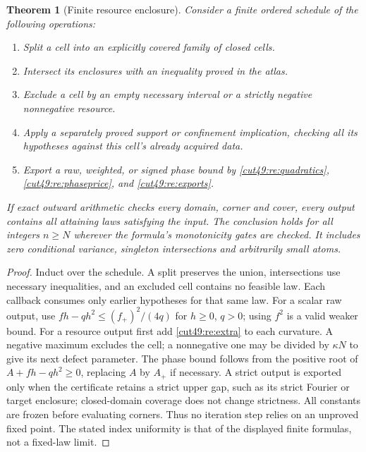 \documentclass[11pt,a4paper]{article}
\numberwithin{equation}{section}
\newtheorem{theorem}{Theorem}[section]
\theoremstyle{definition}
\theoremstyle{remark}
\begin{document}
\begin{theorem}[Finite resource enclosure]\label{cut49:re:enclosure}
Consider a finite ordered schedule of the following operations:
\begin{enumerate}
\item Split a cell into an explicitly covered family of closed cells.
\item Intersect its enclosures with an inequality proved in the atlas.
\item Exclude a cell by an empty necessary interval or a strictly
negative nonnegative resource.
\item Apply a separately proved support or confinement implication,
checking all its hypotheses against this cell's already acquired data.
\item Export a raw, weighted, or signed phase bound by
\eqref{cut49:re:quadratics}, \eqref{cut49:re:phaseprice}, and \eqref{cut49:re:exports}.
\end{enumerate}
If exact outward arithmetic checks every domain, corner and cover,
every output contains all attaining laws satisfying the input. The
conclusion holds for all integers $n\ge N$ wherever the formula's
monotonicity gates are checked. It includes zero conditional variance,
singleton intersections and arbitrarily small atoms.
\end{theorem}
\begin{proof}
Induct over the schedule. A split preserves the union, intersections use
necessary inequalities, and an excluded cell contains no feasible law.
Each callback consumes only earlier hypotheses for that same law.
For a scalar raw output, use
$fh-qh^2\le(f_+)^2/(4q)$ for $h\ge0$, $q>0$; using $f^2$ is a valid
weaker bound. For a resource output first add \eqref{cut49:re:extra} to each
curvature. A negative maximum excludes the cell; a nonnegative one may
be divided by $\kappa N$ to give its next defect parameter.
The phase bound follows from the positive root of
$A+fh-qh^2\ge0$, replacing $A$ by $A_+$ if necessary.
A strict output is exported only when the certificate retains a strict
upper gap, such as its strict Fourier or target enclosure; closed-domain
coverage does not change strictness. All constants are frozen before evaluating
corners. Thus no iteration
step relies on an unproved fixed point. The stated index uniformity is
that of the displayed finite formulas, not a fixed-law limit.
\end{proof}
\end{document}

